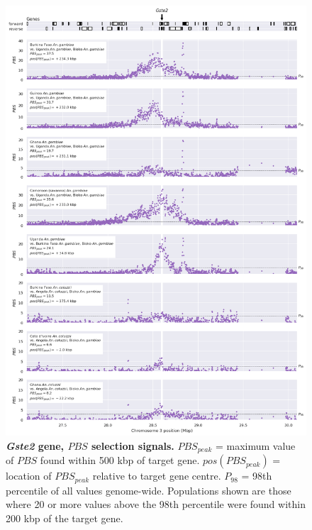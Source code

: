 \documentclass[a4paper,11pt,abstracton,hidelinks]{scrartcl}
\begin{document}
\clearpage
\begin{figure}[t!]
	\begin{center}
		\includegraphics*[width=1\linewidth,center]{artwork/locus_gste2_pbs_pdist.png}
	\end{center}
	\caption[\textit{Gste2} gene, $PBS$ selection signals]{
	\textbf{\textit{Gste2} gene, $PBS$ selection signals.} 
	$PBS_{peak}$ = maximum value of $PBS$ found within 500 kbp of target gene. 
	$pos(PBS_{peak})$ = location of $PBS_{peak}$ relative to target gene centre.
	$P_{98}$ = 98th percentile of all values genome-wide.
	Populations shown are those where 20 or more values above the 98th percentile were found within 200 kbp of the target gene.
	} 
	\label{fig:locus_gste2_pbs}
\end{figure}
\end{document}
